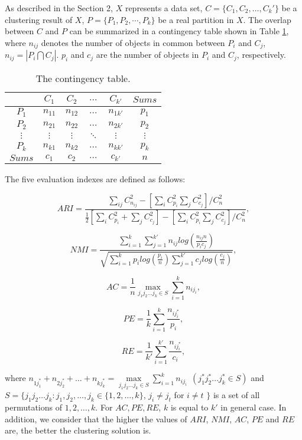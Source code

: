 \documentclass[review]{elsarticle}
\begin{document}
As described in the Section 2, $X$ represents a data set, $C=\{C_1,C_2,\dots,C_k'\}$ be a clustering result of $X$, $P=\{P_1,P_2,\cdots,P_k\}$ be a real partition in $X$. The overlap between $C$ and $P$ can be summarized in a contingency table shown in Table \ref{tab-cont}, where $n_{ij}$ denotes the number of objects in common between $P_i$ and $C_j$, $n_{ij}=|P_i \bigcap C_j|$. $p_i$ and $c_j$ are the number of objects in $P_i$ and $C_j$, respectively.
\begin{table}[!h]
\centering

\caption{The contingency table.}
\label{tab-cont}
\begin{tabular}{cccccc}
\hline\noalign{\smallskip}
  &  $C_1$ & $C_2$ & $\dots$ & $C_{k'}$ & $Sums$\\
\hline
$P_1$ & $n_{11}$ & $n_{12}$ &  $\dots$ & $n_{1k'}$  & $p_1$\\

$P_2$     & $n_{21}$ & $n_{22}$ &  $\dots$ & $n_{2k'}$  & $p_2$\\

$\vdots$  & $\vdots$ & $\vdots$ &  $\ddots$ & $\vdots$  & $\vdots$\\

$P_k$  & $n_{k1}$ & $n_{k2}$ & $\dots$ & $n_{kk'}$  & $p_{k}$\\

$Sums$      & $c_1$     &  $c_2$    & $\dots$ & $c_{k'}$  & $n$ \\

\hline
\end{tabular}
\end{table}

The five evaluation indexes are defined as follows:

$$ARI=\frac{\sum_{ij}C_{n_{ij}}^{2}-[\sum_i C_{p_i}^2 \sum_j  C_{c_j}^2]/C_n^2}
{\frac{1}{2}[\sum_i C_{p_i}^2+\sum_j C_{c_j}^2]-[\sum_iC_{p_i}^2 \sum_j C_{c_j}^2]/C_n^2},$$

$$NMI=\frac{\sum_{i=1}^k\sum_{j=1}^{k'}n_{ij}log(\frac{n_{ij}n}{p_{i}c_{j}})}
         {\sqrt{\sum_{i=1}^{k}p_{i}log(\frac{p_i}{n})\sum_{j=1}^{k'}c_{j}log(\frac{c_j}{n})}},$$

$$AC=\frac{1}{n}\max\limits_{j_1 j_2 \dots j_k \in S}\sum_{i=1}^{k}n_{ij_i},$$

$$PE=\frac{1}{k}\sum_{i=1}^{k}\frac{n_{ij_i^*}}{p_i},$$

$$RE=\frac{1}{k'}\sum_{i=1}^{k'}\frac{n_{ij_i^*}}{c_{i}},$$

where  $n_{1j_1^*}+n_{2j_2^*}+\dots+n_{kj_k^*}=\max\limits_{j_1 j_2 \dots j_k \in S}\sum_{i=1}^{k}n_{ij_i}\ \ (j_1^* j_2^* \dots j_k^* \in S)$ and $S=\{j_1j_2 \dots j_k: j_1,j_2, \dots, j_k \in \{1,2,\dots,k\}$, $j_i\neq j_t$ for $i\neq t$ $\}$ is a set of all permutations of $1,2,\dots,k$. For $AC, PE, RE$, $k$ is equal to $k'$ in general case. In addition, we consider that the higher the values of $ARI$, $NMI$, $AC$, $PE$ and $RE$ are, the better the clustering solution is.
\end{document}
